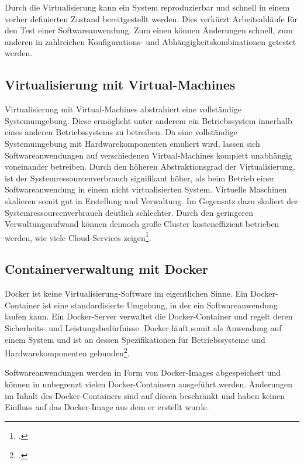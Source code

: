 Durch die Virtualisierung kann ein System reproduzierbar und schnell in einem vorher definierten Zustand bereitgestellt werden. Dies verkürzt Arbeitsabläufe für den Test einer Softwareanwendung. Zum einen können Änderungen schnell, zum anderen in zahlreichen Konfigurations- und Abhängigkeitskombinationen getestet werden.

\subsection{Virtualisierung mit Virtual-Machines}

Virtualisierung mit Virtual-Machines abstrahiert eine vollständige Systemumgebung. Diese ermöglicht unter anderem ein Betriebssystem innerhalb eines anderen Betriebssystems zu betreiben. Da eine vollständige Systemumgebung mit Hardwarekomponenten emuliert wird, lassen sich Softwareanwendungen auf verschiedenen Virtual-Machines komplett unabhängig voneinander betreiben.
Durch den höheren Abstraktionsgrad der Virtualisierung, ist der Systemressourcenverbrauch signifikant höher, als beim Betrieb einer Softwareanwendung in einem nicht virtualisierten System. Virtuelle Maschinen skalieren somit gut in Erstellung und Verwaltung. Im Gegensatz dazu skaliert der Systemressourcenverbrauch deutlich schlechter. Durch den geringeren Verwaltungsaufwand können dennoch große Cluster kosteneffizient betrieben werden, wie viele Cloud-Services zeigen\footcite[vgl.][]{a-cloud-guru-cost}.

\subsection{Containerverwaltung mit Docker}

Docker ist keine Virtualisierung-Software im eigentlichen Sinne. Ein Docker-Container ist eine standardisierte Umgebung, in der ein Softwareanwendung laufen kann. Ein Docker-Server verwaltet die Docker-Container und regelt deren Sicherheits- und Leistungsbedürfnisse. Docker läuft somit als Anwendung auf einem System und ist an dessen Spezifikationen für Betriebssysteme und Hardwarekomponenten gebunden\footcite[vgl.][Kap. Why are containers important]{learn-docker}.

Softwareanwendungen werden in Form von Docker-Images abgespeichert und können in unbegrenzt vielen Docker-Containern ausgeführt werden. Änderungen im Inhalt des Docker-Containers sind auf diesen beschränkt und haben keinen Einfluss auf das Docker-Image aus dem er erstellt wurde.

